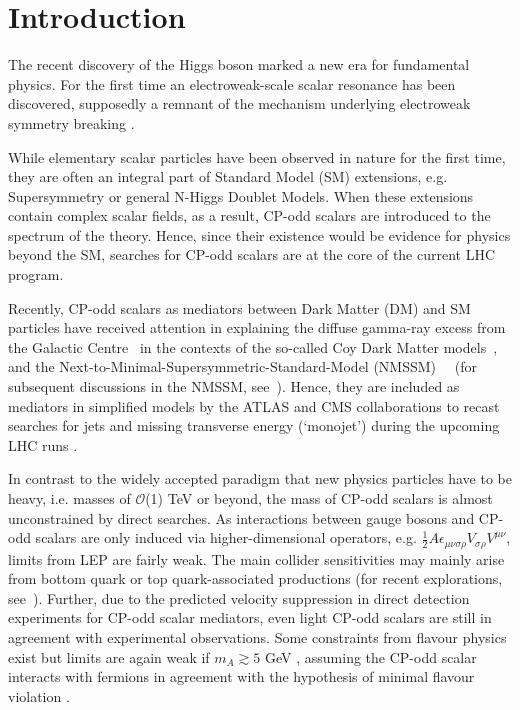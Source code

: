 \documentclass[preprintnumbers,superscriptaddress,nofootinbib,aps,prd,floatfix]{revtex4}
\begin{document}
\section{Introduction}
\label{sec:intro}
The recent discovery of the Higgs boson \cite{Chatrchyan:2012ufa,Aad:2012tfa} marked a new era for fundamental physics. For the first time an electroweak-scale scalar resonance has been discovered, supposedly a remnant of the mechanism underlying electroweak symmetry breaking \cite{orig}.

While elementary scalar particles have been observed in nature for the first time, they are often an integral part of Standard Model (SM) extensions, e.g. Supersymmetry or general N-Higgs Doublet Models. When these extensions contain complex scalar fields, as a result, CP-odd scalars are introduced to the spectrum of the theory. Hence, since their existence would be evidence for physics beyond the SM, searches for CP-odd scalars are at the core of the 
current LHC program. 

Recently, CP-odd scalars as mediators between Dark Matter (DM) and SM particles have received attention in explaining the diffuse gamma-ray excess from the Galactic Centre~\cite{Goodenough:2009gk,Hooper:2010mq,Abazajian:2012pn,Daylan:2014rsa} in the contexts of the so-called Coy Dark Matter models~\cite{Boehm:2014hva,Abdullah:2014lla,Hektor:2014kga,Arina:2014yna}, and the Next-to-Minimal-Supersymmetric-Standard-Model (NMSSM)~~\cite{Cheung:2014lqa,Huang:2014cla} (for subsequent discussions in the NMSSM, see~\cite{Cahill-Rowley:2014ora,Guo:2014gra,Cao:2014efa,Bi:2015qva,Butter:2015fqa}). Hence, they are included as mediators in simplified models by the ATLAS and CMS collaborations to recast searches for  jets and missing transverse energy (`monojet') during the upcoming LHC runs \cite{Malik:2014ggr,Abdallah:2014hon}.

In contrast to the widely accepted paradigm that new physics particles have to be heavy, i.e. masses of $\mathcal{O}$(1) TeV or beyond, the mass of CP-odd scalars is almost unconstrained by direct searches. As interactions between gauge bosons and CP-odd scalars are only induced via higher-dimensional operators, e.g. $\frac{1}{2} A \epsilon_{\mu \nu \sigma \rho} V_{\sigma \rho} V^{\mu \nu}$, limits from LEP are fairly weak. The main collider sensitivities may mainly arise from bottom quark or top quark-associated productions (for recent explorations, see~\cite{Craig:2015jba,Hajer:2015gka}). Further, due to the predicted velocity suppression in direct detection experiments for CP-odd scalar mediators, even light CP-odd scalars are still in agreement with experimental observations. Some constraints from flavour physics exist but limits are again weak if $m_A \gtrsim 5$ GeV \cite{Dolan:2014ska}, assuming the CP-odd scalar interacts with fermions in agreement with the hypothesis of minimal flavour violation \cite{D'Ambrosio:2002ex}. 
\end{document}

